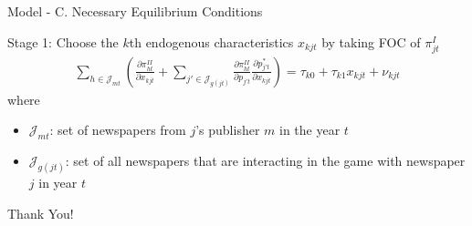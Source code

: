 \documentclass[aspectratio=169]{beamer}
\begin{document}
\begin{frame}{Model - C. Necessary Equilibrium Conditions}
	
	\begin{block}{Stage 1: Choose the $k$th endogenous characteristics $x_{kjt}$ by taking FOC of $\pi_{jt}^{I}$}
		\begin{align}
			\sum_{h \in \mathcal{J}_{mt}} \left( \frac{\partial \pi_{ht}^{II}}{\partial x_{kjt}} + \sum_{j' \in \mathcal{J}_{g(jt)}} \frac{\partial \pi_{ht}^{II}}{\partial p_{j't}} \frac{\partial p^{*}_{j't}}{\partial x_{kjt}}\right) = \tau_{k0} + \tau_{k1} x_{kjt} + \nu_{kjt}
		\end{align}
		where
		\begin{itemize}
			\item $\mathcal{J}_{mt}$: set of newspapers from $j$'s publisher $m$ in the year $t$
			\item $\mathcal{J}_{g(jt)}$: set of all newspapers that are interacting in the game with newspaper $j$ in year $t$
		\end{itemize}
	\end{block}

\end{frame}

\begin{frame}
    \begin{center}
        \LARGE{Thank You!}
    \end{center}
\end{frame}
\end{document}

